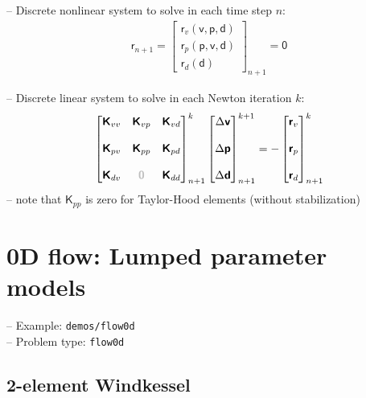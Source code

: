 \documentclass[a4paper,12pt]{report}
\newcommand{\bs}[1]{\boldsymbol{#1}}
\newcommand{\zerom}{\textcolor{lightgray}{\bs{\mathsf{0}}}}
\newcommand{\ROP}{\bs{\mathsf{r}}}
\begin{document}
-- Discrete nonlinear system to solve in each time step $n$:
\begin{align}
\ROP_{n+1} = \begin{bmatrix} \ROP_{v}(\bs{\mathsf{v}},\bs{\mathsf{p}},\bs{\mathsf{d}}) \\ \ROP_{p}(\bs{\mathsf{p}},\bs{\mathsf{v}},\bs{\mathsf{d}}) \\ \ROP_{d}(\bs{\mathsf{d}}) \end{bmatrix}_{n+1} = \bs{\mathsf{0}}\label{eq:nonlin_sys_fluid_ale}
\end{align}

-- Discrete linear system to solve in each Newton iteration $k$:
\begin{align}
\begin{bmatrix} \bs{\mathsf{K}}_{vv} & \bs{\mathsf{K}}_{vp} & \bs{\mathsf{K}}_{vd} \\ \\ \bs{\mathsf{K}}_{pv} & \bs{\mathsf{K}}_{pp} & \bs{\mathsf{K}}_{pd} \\ \\ \bs{\mathsf{K}}_{dv}  & \zerom & \bs{\mathsf{K}}_{dd} \end{bmatrix}_{n+1}^{k}\begin{bmatrix} \Delta\bs{\mathsf{v}} \\ \\ \Delta\bs{\mathsf{p}} \\ \\ \Delta\bs{\mathsf{d}} \end{bmatrix}_{n+1}^{k+1}=-\begin{bmatrix} \ROP_{v} \\ \\ \ROP_{p} \\ \\ \ROP_{d} \end{bmatrix}_{n+1}^{k} \label{eq:lin_sys_fluid_ale}
\end{align}
-- note that $\bs{\mathsf{K}}_{pp}$ is zero for Taylor-Hood elements (without stabilization)


\section{0D flow: Lumped parameter models}\label{sec:flow0d}

-- Example: \verb.demos/flow0d.\\

-- Problem type: \verb.flow0d.\\

\subsection{2-element Windkessel}
\end{document}
